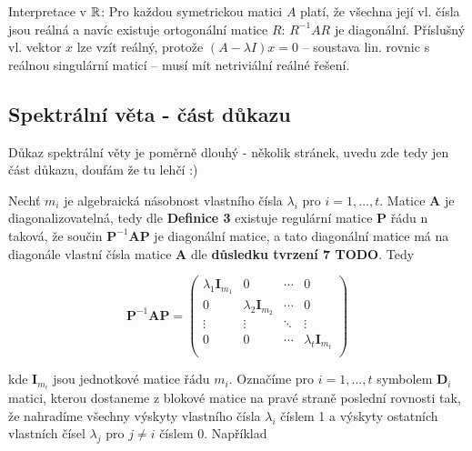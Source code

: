\begin{dusledek} Interpretace v $\mathbb{R}$:
Pro každou symetrickou matici $A$ platí, že všechna její vl. čísla jsou reálná a navíc existuje ortogonální matice $R$: $R^{-1}AR$ je diagonální.
Příslušný vl. vektor $x$ lze vzít reálný, protože $(A - \lambda I)x = 0$ -- soustava lin. rovnic s reálnou singulární maticí -- musí mít netriviální reálné řešení.
\end{dusledek}


\subsection{Spektrální věta - část důkazu}


\begin{dukaz}
Důkaz spektrální věty je poměrně dlouhý - několik stránek, uvedu zde tedy jen část důkazu, doufám že tu lehčí :)

\bigskip
\noindent \textbf{}

Nechť $m_i$ je algebraická násobnost vlastního čísla $\lambda_i$ pro $i=1,...,t$. Matice \textbf{A} je diagonalizovatelná, tedy dle \textbf{Definice 3} existuje regulární matice \textbf{P} řádu n taková, že součin $\textbf{P}^{-1}\textbf{A}\textbf{P}$ je diagonální matice, a tato diagonální matice má na diagonále vlastní čísla matice \textbf{A} dle \textbf{důsledku tvrzení 7 TODO}.  Tedy

\begin{equation}\label{pap}
\textbf{P}^{-1}\textbf{A}\textbf{P} = \begin{pmatrix}
  \lambda_1 \textbf{I}_{m_1} & 0 & \cdots & 0 \\
  0 & \lambda_2 \textbf{I}_{m_2} & \cdots & 0 \\
  \vdots & \vdots & \ddots & \vdots \\
  0 & 0 & \cdots & \lambda_t \textbf{I}_{m_t} \\
\end{pmatrix}
\end{equation}

kde $\textbf{I}_{m_i}$ jsou jednotkové matice řádu $m_i$. Označíme pro $i=1,...,t$ symbolem $\textbf{D}_i$ matici, kterou dostaneme z blokové matice na pravé straně poslední rovnosti tak, že nahradíme všechny výskyty vlastního čísla $\lambda_i$ číslem 1 a výskyty ostatních vlastních čísel $\lambda_j$ pro $j \neq i$ číslem 0. Například


\end{dukaz}
